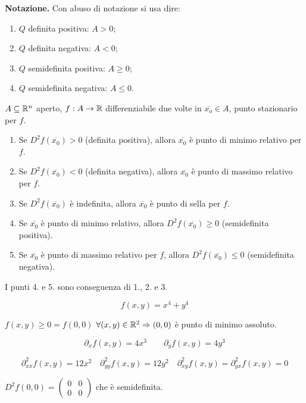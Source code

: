 \begin{attbar}
	\textbf{Notazione.} Con abuso di notazione si usa dire:
	\begin{enumerate}
		\item $Q$ definita positiva: $A >0$; 
		\item $Q$ definita negativa: $A<0$;
		\item $Q$ semidefinita positiva: $A \geq 0$;
		\item $Q$ semidefinita negativa: $A \leq 0$.
	\end{enumerate}
\end{attbar}


\begin{theorem}
	
	\label{th: pag 385}
	$A \subseteq \mathbb{R}^n$ aperto, $f:A \rightarrow  \mathbb{R}$ differenziabile due volte in $\overline{x_o}\in A$, punto stazionario per $f$.
	\begin{enumerate}
		\item Se $D^2f(\overline{x_0})>0 ${\color{blue} (definita positiva)}, allora $\overline{x_0}$ è punto di minimo relativo per $f$.
		\item Se $D^2f(\overline{x_0})<0${\color{blue} (definita negativa)}, allora $\overline{x_0}$ è punto di massimo relativo per $f$. 
		\item Se $D^2f(\overline{x_0})$ è indefinita, allora $\overline{x_0}$ è punto di sella per $f$.
		\item Se $\overline{x_0}$ è punto di minimo relativo, allora $D^2f(\overline{x_0})\geq0$ {\color{blue}(semidefinita positiva)}.
		\item Se $\overline{x_0}$ è punto di massimo relativo per $f$, allora $D^2f(\overline{x_0})\leq0$ {\color{blue}(semidefinita negativa)}.
	\end{enumerate}
\end{theorem}


\begin{attbar}
	I punti 4. e 5. sono conseguenza di 1., 2. e 3.
\end{attbar}


\begin{exbar}
	$$f(x,y)=x^4+y^4$$
	
	$f(x,y)\geq 0 = f(0,0)$ $\forall (x,y)\in \mathbb{R}^2 \Rightarrow (0,0)$ è punto di minimo assoluto.
	
	$$\partial_xf(x,y)=4x^3 \qquad \partial_yf(x,y)=4y^3$$
	
	$$\partial_{xx}^2f(x,y)=12x^2 \quad \partial_{yy}^2f(x,y)=12y^2 \quad \partial_{xy}^2f(x,y)=\partial_{yx}^2f(x,y)=0$$
	
	{\centering $D^2f(0,0)=\begin{pmatrix}
		0&0\\
		0&0
	\end{pmatrix}$
	che è semidefinita. \par}
\end{exbar}

